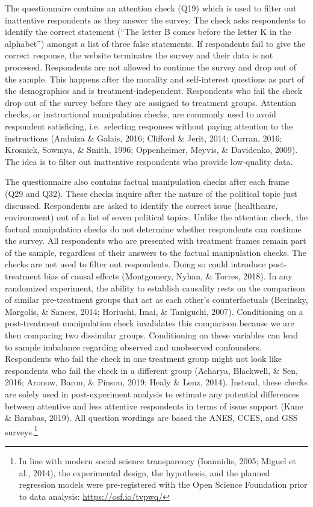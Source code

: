 \documentclass[12pt,econ]{sources/authesis}
\begin{document}
The questionnaire contains an attention check (Q19) which is used to filter out inattentive respondents as they answer the survey. The check asks respondents to identify the correct statement (``The letter B comes before the letter K in the alphabet'') amongst a list of three false statements. If respondents fail to give the correct response, the website terminates the survey and their data is not processed. Respondents are not allowed to continue the survey and drop out of the sample. This happens after the morality and self-interest questions as part of the demographics and is treatment-independent. Respondents who fail the check drop out of the survey before they are assigned to treatment groups. Attention checks, or instructional manipulation checks, are commonly used to avoid respondent satisficing, i.e.~selecting responses without paying attention to the instructions (Anduiza \& Galais, 2016; Clifford \& Jerit, 2014; Curran, 2016; Krosnick, Sowmya, \& Smith, 1996; Oppenheimer, Meyvis, \& Davidenko, 2009). The idea is to filter out inattentive respondents who provide low-quality data.

The questionnaire also contains factual manipulation checks after each frame (Q29 and Q32). These checks inquire after the nature of the political topic just discussed. Respondents are asked to identify the correct issue (healthcare, environment) out of a list of seven political topics. Unlike the attention check, the factual manipulation checks do not determine whether respondents can continue the survey. All respondents who are presented with treatment frames remain part of the sample, regardless of their answers to the factual manipulation checks. The checks are not used to filter out respondents. Doing so could introduce post-treatment bias of causal effects (Montgomery, Nyhan, \& Torres, 2018). In any randomized experiment, the ability to establish causality rests on the comparison of similar pre-treatment groups that act as each other's counterfactuals (Berinsky, Margolis, \& Sances, 2014; Horiuchi, Imai, \& Taniguchi, 2007). Conditioning on a post-treatment manipulation check invalidates this comparison because we are then comparing two dissimilar groups. Conditioning on these variables can lead to sample imbalance regarding observed and unobserved confounders. Respondents who fail the check in one treatment group might not look like respondents who fail the check in a different group (Acharya, Blackwell, \& Sen, 2016; Aronow, Baron, \& Pinson, 2019; Healy \& Lenz, 2014). Instead, these checks are solely used in post-experiment analysis to estimate any potential differences between attentive and less attentive respondents in terms of issue support (Kane \& Barabas, 2019). All question wordings are based the ANES, CCES, and GSS surveys.\footnote{In line with modern social science transparency (Ioannidis, 2005; Miguel et al., 2014), the experimental design, the hypothesis, and the planned regression models were pre-registered with the Open Science Foundation prior to data analysis: \url{https://osf.io/tvpwq/}}
\end{document}
